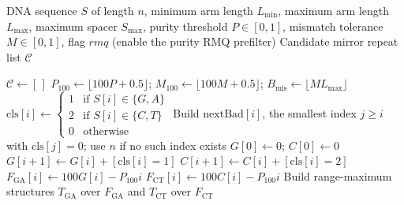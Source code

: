 \documentclass{article}
\begin{document}
\begin{algorithm}
\caption{HSeeker Phase 1: Candidate Enumeration and Normalization}
\label{alg:mirror-phase1}
\scriptsize
\begin{algorithmic}[1]
\Require
    DNA sequence $S$ of length $n$,
    minimum arm length $L_{\min}$,
    maximum arm length $L_{\max}$,
    maximum spacer $S_{\max}$,
    purity threshold $P \in [0,1]$,
    mismatch tolerance $M \in [0,1]$,
    flag $\mathit{rmq}$ (enable the purity RMQ prefilter)
\Ensure Candidate mirror repeat list $\mathcal{C}$

\State $\mathcal{C} \gets [\,]$
\State $P_{100} \gets \lfloor 100P + 0.5 \rfloor$;\;
       $M_{100} \gets \lfloor 100M + 0.5 \rfloor$;\;
       $B_{\mathrm{mis}} \gets \lfloor M L_{\max} \rfloor$
        \State $\mathrm{cls}[i] \gets
            \begin{cases}
                1 & \text{if } S[i]\in\{G,A\}\\
                2 & \text{if } S[i]\in\{C,T\}\\
                0 & \text{otherwise}
            \end{cases}$
    \EndFor
    \State Build $\mathrm{nextBad}[i]$, the smallest index $j \ge i$ with
           $\mathrm{cls}[j]=0$; use $n$ if no such index exists
    \State $G[0]\gets 0$;\; $C[0]\gets 0$
        \State $G[i+1] \gets G[i] + [\mathrm{cls}[i]=1]$
        \State $C[i+1] \gets C[i] + [\mathrm{cls}[i]=2]$
    \EndFor
        \State $F_{\mathrm{GA}}[i] \gets 100G[i] - P_{100}i$
        \State $F_{\mathrm{CT}}[i] \gets 100C[i] - P_{100}i$
    \EndFor
    \State Build range-maximum structures $T_{\mathrm{GA}}$ over $F_{\mathrm{GA}}$
           and $T_{\mathrm{CT}}$ over $F_{\mathrm{CT}}$
\EndIf


\end{algorithmic}
\end{algorithm}
\end{document}
